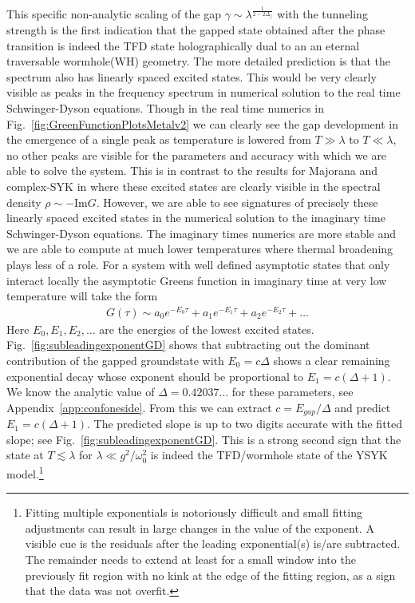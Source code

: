 This specific non-analytic scaling of the gap $\gamma \sim \lambda^{\frac{1}{2-2\Delta_f}}$ with the tunneling strength is the first indication that the gapped state obtained after the phase transition  is indeed the TFD state holographically dual to an 
an eternal traversable wormhole(WH) geometry. The more detailed prediction is that the spectrum also has linearly spaced excited states. This would be very clearly visible as peaks in the frequency spectrum in numerical solution to the real time Schwinger-Dyson equations. Though in the real time numerics in 
Fig.~\ref{fig:GreenFunctionPlotsMetalv2} we can clearly see the gap development  in the emergence of a single peak as temperature is lowered from $T\gg \lambda $ to $T\ll \lambda$, no other peaks are visible for the parameters and accuracy with which we are able to solve the system. This is in contrast to the results for Majorana and complex-SYK in \cite{pluggeRevivalDynamicsTraversable2020a,sahooTraversableWormholeHawkingPage2020}
 where these excited states are clearly visible in the spectral density $\rho \sim -\text{Im}G$. 
However, we are able to see signatures of precisely these linearly spaced excited states in the numerical solution to the imaginary time Schwinger-Dyson equations. The imaginary times numerics are more stable and we are able to compute at much lower temperatures where thermal broadening plays less of a role. For a system with well defined asymptotic states that only interact locally the asymptotic Greens function in imaginary time at very low temperature will take the form
\begin{align}
    G(\tau) \sim a_0e^{-E_0\tau} +a_1 e^{-E_1\tau} +a_2e^{-E_2\tau} +\ldots
    \label{eq:SumExponentsSchem}
\end{align}
Here $E_0, E_1, E_2, \ldots$ are the energies of the lowest excited states.
Fig.~\ref{fig:subleadingexponentGD} shows that subtracting out the dominant contribution of the gapped groundstate with $E_0 = c\Delta$ shows a clear remaining exponential decay whose exponent should be proportional to $E_1 = c(\Delta+1)$. We know the analytic value of $\Delta= 0.42037\ldots$ for these parameters, see Appendix~\ref{app:confoneside}. 
From this we can extract $c=E_{gap}/\Delta$ and predict $E_1=c(\Delta+1)$. The predicted slope is up to two digits accurate with the fitted slope; see Fig.~\ref{fig:subleadingexponentGD}. This is a strong second sign that the state at $T\lesssim \lambda$ for $\lambda\ll g^{2}/\omega_0^2$  is indeed the TFD/wormhole state of the YSYK model.\footnote{Fitting multiple exponentials is notoriously difficult and small fitting adjustments can result in large changes in the value of the exponent. A visible cue is the residuals after the leading exponential(s) is/are subtracted. The remainder needs to extend at least for a small window into the previously fit region with no kink at the edge of the fitting region, as a sign that the data was not overfit.}
 


